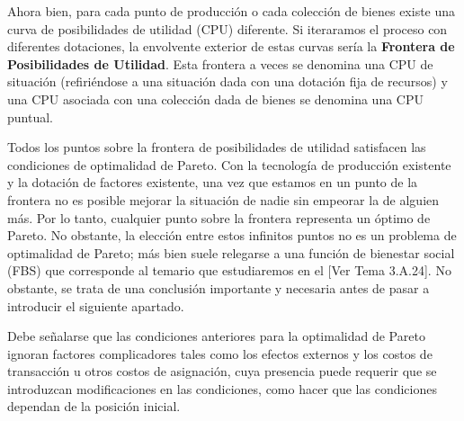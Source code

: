 \documentclass[10pt,a4paper]{article}
\newcommand{\authorfont}[1]{{\fontfamily{EBGaramond-TLF}\selectfont #1}}
\begin{document}
Ahora bien, para cada punto de producción o cada colección de bienes existe una curva de posibilidades de utilidad (CPU) diferente. Si iteraramos el proceso con diferentes dotaciones, la envolvente exterior de estas curvas sería la \textbf{Frontera de Posibilidades de Utilidad}. Esta frontera a veces se denomina una CPU de situación (refiriéndose a una situación dada con una dotación fija de recursos) y una CPU asociada con una colección dada de bienes se denomina una CPU puntual. 

Todos los puntos sobre la frontera de posibilidades de utilidad satisfacen las condiciones de optimalidad de Pareto. Con la tecnología de producción existente y la dotación de factores existente, una vez que estamos en un punto de la frontera no es posible mejorar la situación de nadie sin empeorar la de alguien más. Por lo tanto, cualquier punto sobre la frontera representa un óptimo de Pareto. No obstante, la elección entre estos infinitos puntos no es un problema de optimalidad de Pareto; más bien suele relegarse a una función de bienestar social (FBS) que corresponde al temario que estudiaremos en el [\authorfont{Ver Tema 3.A.24}]. No obstante, se trata de una conclusión importante y necesaria antes de pasar a introducir el siguiente apartado.

Debe señalarse que las condiciones anteriores para la optimalidad de Pareto ignoran factores complicadores tales como los efectos externos y los costos de transacción u otros costos de asignación, cuya presencia puede requerir que se introduzcan modificaciones en las condiciones, como hacer que las condiciones dependan de la posición inicial.
\end{document}
